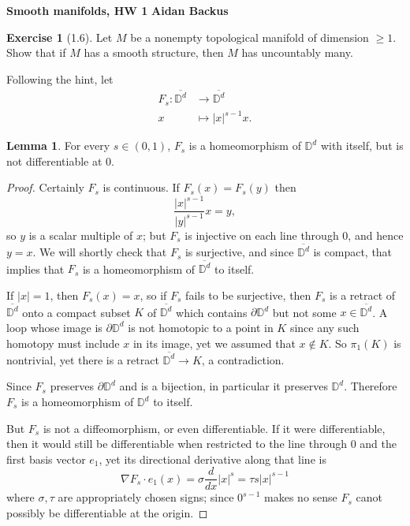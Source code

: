 \documentclass[10pt]{article}
\newcommand{\DD}{\mathbb D}
\theoremstyle{definition}
\newtheorem{exer}{Exercise}
\newtheorem{lemma}{Lemma}[exer]
\begin{document}
\noindent
\large\textbf{Smooth manifolds, HW 1} \hfill \textbf{Aidan Backus} \\


\begin{exer}[1.6]
Let $M$ be a nonempty topological manifold of dimension $\geq 1$.
Show that if $M$ has a smooth structure, then $M$ has uncountably many.
\end{exer}

Following the hint, let
\begin{align*}
F_s: \overline{\DD^d} &\to \overline{\DD^d}\\
x &\mapsto |x|^{s-1}x.
\end{align*}
\begin{lemma}
For every $s \in (0, 1)$, $F_s$ is a homeomorphism of $\DD^d$ with itself, but is not differentiable at $0$.
\end{lemma}
\begin{proof}
Certainly $F_s$ is continuous. If $F_s(x) = F_s(y)$ then
$$\frac{|x|^{s-1}}{|y|^{s-1}}x = y,$$
so $y$ is a scalar multiple of $x$; but $F_s$ is injective on each line through $0$, and hence $y = x$.
We will shortly check that $F_s$ is surjective, and since $\overline{\DD^d}$ is compact, that implies that $F_s$ is a homeomorphism of $\overline{\DD^d}$ to itself.

If $|x| = 1$, then $F_s(x) = x$, so if $F_s$ fails to be surjective, then $F_s$ is a retract of $\overline{\DD^d}$ onto a compact subset $K$ of $\overline{\DD^d}$ which contains $\partial \DD^d$ but not some $x \in \overline{\DD^d}$.
A loop whose image is $\partial \DD^d$ is not homotopic to a point in $K$ since any such homotopy must include $x$ in its image, yet we assumed that $x \notin K$.
So $\pi_1(K)$ is nontrivial, yet there is a retract $\overline{\DD^d} \to K$, a contradiction.

Since $F_s$ preserves $\partial \DD^d$ and is a bijection, in particular it preserves $\DD^d$.
Therefore $F_s$ is a homeomorphism of $\DD^d$ to itself.

But $F_s$ is not a diffeomorphism, or even differentiable.
If it were differentiable, then it would still be differentiable when restricted to the line through $0$ and the first basis vector $e_1$, yet its directional derivative along that line is
$$\nabla F_s \cdot e_1(x) = \sigma \frac{d}{dx} |x|^s = \tau s|x|^{s-1}$$
where $\sigma,\tau$ are appropriately chosen signs; since $0^{s-1}$ makes no sense $F_s$ canot possibly be differentiable at the origin.
\end{proof}
\end{document}
